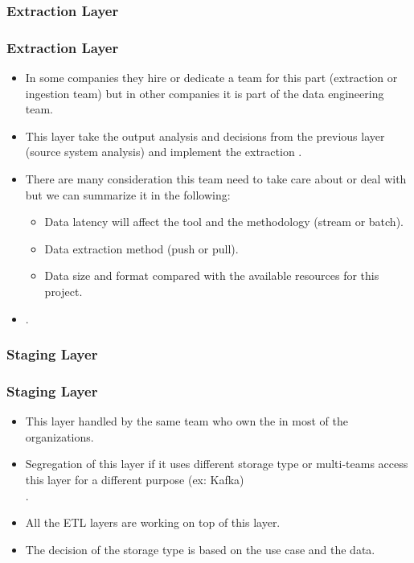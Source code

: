 
\subsubsection{Extraction Layer}

\begin{frame}
\frametitle{Extraction Layer}
\begin{itemize}[<+->]
	\item In some companies they hire or dedicate a team for this part (extraction or ingestion team) but in other companies it is part of the data engineering team.
	\item This layer take the output analysis and decisions from the previous layer (source system analysis) and implement the extraction .
	\item There are many consideration this team need to take care about or deal with but we can summarize it in the following:
		\begin{itemize}			
			\item  Data latency will affect the tool and the methodology (stream or batch).
			\item  Data extraction method (push or pull).
			\item  Data size and format compared with the available resources for this project.
		\end{itemize}
	\item {}.

\end{itemize}

\end{frame}


\subsubsection{Staging Layer}

\begin{frame}
\frametitle{Staging Layer}
\begin{itemize}[<+->]
	\item This layer handled by the same team who own the  in most of the organizations. 
	\item Segregation of this layer if it uses different storage type or multi-teams access this layer for a different purpose (ex: Kafka)\\ .
	\item All the ETL layers are working on top of this layer.
	\item The decision of the storage type is based on the use case and the data.
	
\end{itemize}

\end{frame}


